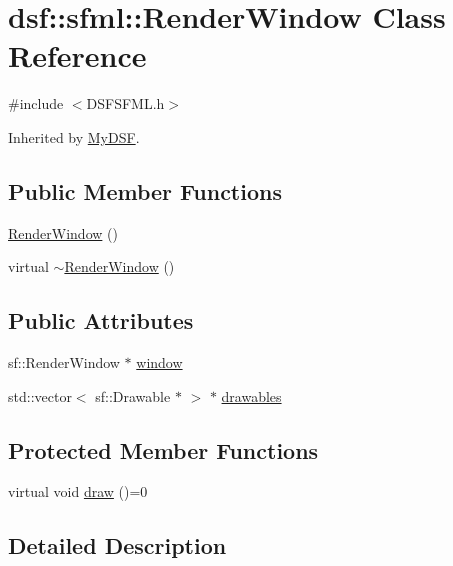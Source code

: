\hypertarget{classdsf_1_1sfml_1_1_render_window}{}\section{dsf\+:\+:sfml\+:\+:Render\+Window Class Reference}
\label{classdsf_1_1sfml_1_1_render_window}


{\ttfamily \#include $<$D\+S\+F\+S\+F\+M\+L.\+h$>$}



Inherited by \hyperlink{class_my_d_s_f}{My\+D\+S\+F}.

\subsection*{Public Member Functions}
\begin{DoxyCompactItemize}
\item 
\hyperlink{classdsf_1_1sfml_1_1_render_window_a86b08e1ee47f8cde51a731050be2f360}{Render\+Window} ()
\item 
virtual \hyperlink{classdsf_1_1sfml_1_1_render_window_a3ef144a6351af67efcb71a647417da64}{$\sim$\+Render\+Window} ()
\end{DoxyCompactItemize}
\subsection*{Public Attributes}
\begin{DoxyCompactItemize}
\item 
sf\+::\+Render\+Window $\ast$ \hyperlink{classdsf_1_1sfml_1_1_render_window_a2c04b61ca1bfba140120001c4a9a30e1}{window}
\item 
std\+::vector$<$ sf\+::\+Drawable $\ast$ $>$ $\ast$ \hyperlink{classdsf_1_1sfml_1_1_render_window_a745350dfdb1f752359f9055d714c453d}{drawables}
\end{DoxyCompactItemize}
\subsection*{Protected Member Functions}
\begin{DoxyCompactItemize}
\item 
virtual void \hyperlink{classdsf_1_1sfml_1_1_render_window_ae61615a7eaa041c97ac4aed62361479a}{draw} ()=0
\end{DoxyCompactItemize}


\subsection{Detailed Description}


